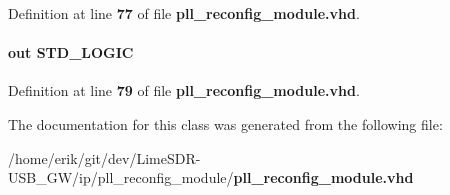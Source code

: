 Definition at line {\bf 77} of file {\bf pll\+\_\+reconfig\+\_\+module.\+vhd}.

\paragraph[{write\+\_\+rom\+\_\+ena}]{ {\bfseries \textcolor{keywordflow}{out}\textcolor{vhdlchar}{ }} {\bfseries \textcolor{comment}{S\+T\+D\+\_\+\+L\+O\+G\+IC}\textcolor{vhdlchar}{ }} \hspace{0.3cm}{\ttfamily [Port]}}\label{classpll__reconfig__module__pllrcfg__ok11_a1cb01f4ddb502de49ab2503974ce6437}


Definition at line {\bf 79} of file {\bf pll\+\_\+reconfig\+\_\+module.\+vhd}.



The documentation for this class was generated from the following file\+:\begin{DoxyCompactItemize}
\item 
/home/erik/git/dev/\+Lime\+S\+D\+R-\/\+U\+S\+B\+\_\+\+G\+W/ip/pll\+\_\+reconfig\+\_\+module/{\bf pll\+\_\+reconfig\+\_\+module.\+vhd}\end{DoxyCompactItemize}
